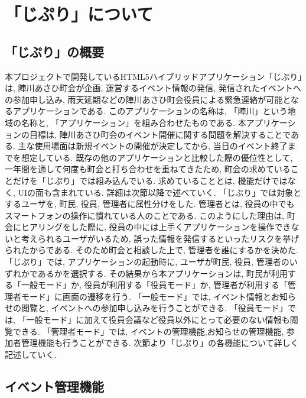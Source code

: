 \chapter{「じぷり」について}

\section{「じぷり」の概要\label{sec:app_overview}} 
本プロジェクトで開発しているHTML5ハイブリッドアプリケーション「じぷり」は, 陣川あさひ町会が企画, 運営するイベント情報の発信, 発信されたイベントへの参加申し込み, 雨天延期などの陣川あさひ町会役員による緊急連絡が可能となるアプリケーションである. このアプリケーションの名称は, 「陣川」という地域の名称と, 「アプリケーション」を組み合わせたものである. 本アプリケーションの目標は, 陣川あさひ町会のイベント開催に関する問題を解決することである. 主な使用場面は新規イベントの開催が決定してから, 当日のイベント終了までを想定している. 既存の他のアプリケーションと比較した際の優位性として, 一年間を通して何度も町会と打ち合わせを重ねてきたため, 町会の求めていることだけを「じぷり」では組み込んでいる. 求めていることとは, 機能だけではなく, UIの面も含まれている. 詳細は次節以降で述べていく. 「じぷり」では対象とするユーザを, 町民, 役員, 管理者に属性分けをした. 管理者とは, 役員の中でもスマートフォンの操作に慣れている人のことである. このようにした理由は, 町会にヒアリングをした際に, 役員の中には上手くアプリケーションを操作できないと考えられるユーザがいるため, 誤った情報を発信するといったリスクを挙げられたからである. そのため町会と相談した上で, 管理者を誰にするかを決めた. 「じぷり」では, アプリケーションの起動時に, ユーザが町民, 役員, 管理者のいずれかであるかを選択する. その結果から本アプリケーションは, 町民が利用する「一般モード」か, 役員が利用する「役員モード」か, 管理者が利用する「管理者モード」に画面の遷移を行う. 「一般モード」では, イベント情報とお知らせの閲覧と, イベントへの参加申し込みを行うことができる. 「役員モード」では, 「一般モード」に加えて役員会議など役員以外にとって必要のない情報も閲覧できる. 「管理者モード」では, イベントの管理機能,お知らせの管理機能, 参加者管理機能も行うことができる. 次節より「じぷり」の各機能について詳しく記述していく.

\section{イベント管理機能}%
